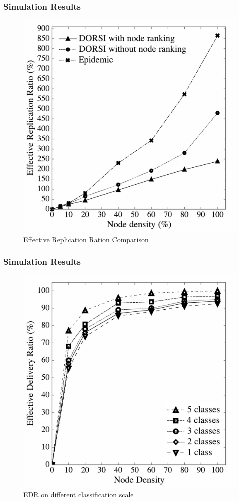 \documentclass{beamer}
\begin{document}
\begin{frame}
	\frametitle{Simulation Results}
\begin{figure}
\centering
\includegraphics[width=0.5\linewidth]{Figures_Present/Fig8-eps-converted-to}
\caption{Effective Replication Ration Comparison}
\label{fig:Fig8-eps-converted-to}
\end{figure}
\end{frame}
\begin{frame}
	\frametitle{Simulation Results}
\begin{figure}
\centering
\includegraphics[width=0.5\linewidth]{Figures_Present/Fig9-eps-converted-to}
\caption{EDR on different classification scale}
\label{fig:Fig9-eps-converted-to}
\end{figure}
\end{frame}
\end{document}
